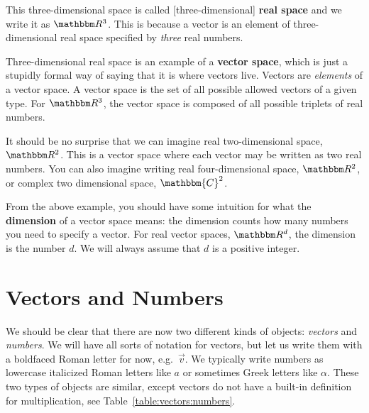 This three-dimensional space is called [three-dimensional] \textbf{real space} and we write it as $\RR ^3$. This is because a vector is an element of three-dimensional real space specified by \emph{three} real numbers. 

Three-dimensional real space is an example of a \textbf{vector space}, which is just a stupidly formal way of saying that it is where vectors live. Vectors are \emph{elements} of a vector space. A vector space is the set of all possible allowed vectors of a given type. For $\RR ^3$, the vector space is composed of all possible triplets of real numbers. 


\begin{example} It should be no surprise that we can imagine real two-dimensional space, $\RR ^2$. This is a vector space where each vector may be written as two real numbers. You can also imagine writing real four-dimensional space, $\RR ^2$, or complex two dimensional space, $\mathbbm{C}^2$. 
\end{example}

From the above example, you should have some intuition for what the \textbf{dimension} of a vector space means: the dimension counts how many numbers you need to specify a vector. For real vector spaces, $\RR ^d$, the dimension is the number $d$. We will always assume that $d$ is a positive integer.





\section{Vectors and Numbers}


We should be clear that there are now two different kinds of objects: \emph{vectors} and \emph{numbers}. We will have all sorts of notation for vectors, but let us write them with a boldfaced Roman letter for now, e.g.~$\vec{v}$. We typically write numbers as lowercase italicized Roman letters like $a$ or sometimes Greek letters like $\alpha$. These two types of objects are similar, except vectors do not have a built-in definition for multiplication, see Table~\ref{table:vectors:numbers}.

